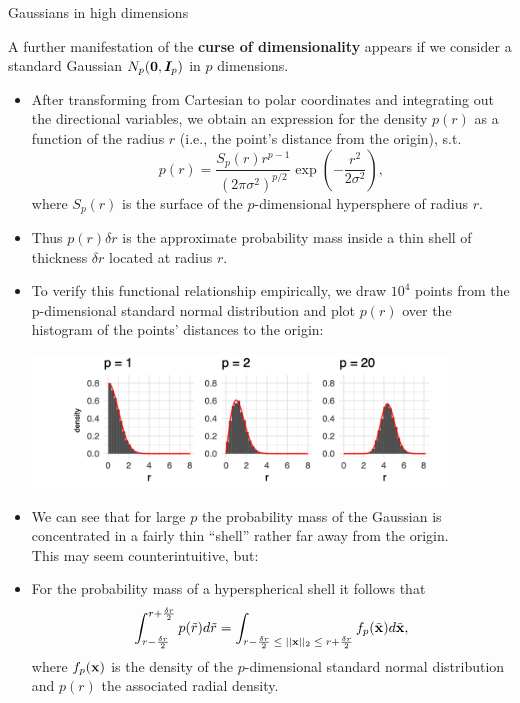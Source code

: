 \begin{vbframe}{Gaussians in high dimensions}

A further manifestation of the \textbf{curse of dimensionality} appears if we consider a standard Gaussian $N_p(\bm{0}, \boldsymbol{I}_p)$ in $p$ dimensions.

\begin{itemize}
    \item After transforming from Cartesian to polar coordinates and integrating out the directional variables, we obtain an expression for the density $p(r)$ as a function of the radius $r$ (i.e., the point's distance from the origin), s.t.
    $$ p(r) = \frac{S_p(r)r^{p-1}}{(2 \pi \sigma^2)^{p/2}} \exp \left( -\frac{r^2}{2\sigma^2}\right),$$
    where $S_p(r)$ is the surface of the $p$-dimensional hypersphere of radius $r$.
    \item Thus $p(r) \delta r$ is the approximate probability mass inside a thin shell of thickness $\delta r$ located at radius $r$.


\framebreak
\item To verify this functional relationship empirically, we draw $10^4$ points from the p-dimensional standard normal distribution and plot $p(r)$ over the histogram of the points' distances to the origin:

\begin{center}
\includegraphics[width = 11cm ]{figure_man/histograms.png}
\end{center}

\item We can see that for large $p$ the probability mass of the Gaussian is concentrated in a fairly thin \enquote{shell} rather far away from the origin. \\
This may seem counterintuitive, but:

\framebreak

  \item For the probability mass of a hyperspherical shell it follows that
    $$\int^{r + \frac{\delta r}{2}}_{r - \frac{\delta r}{2}}p(\tilde{r})d\tilde{r} = \int_{r - \frac{\delta r}{2} \; \leq \; ||\mathbf{x}||_2 \; \leq \; r + \frac{\delta r}{2}} f_p(\tilde{\mathbf{x}}) d\tilde{\mathbf{x}},$$
    where $f_p(\mathbf{x})$ is the density of the $p$-dimensional standard normal distribution and $p(r)$ the associated radial density.


\end{itemize}
\end{vbframe}
